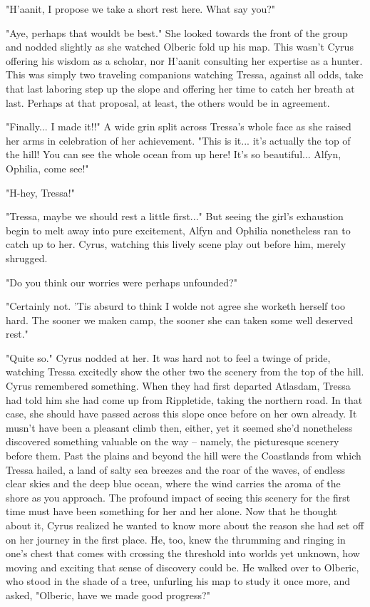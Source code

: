 "H'aanit, I propose we take a short rest here. What say you?"

"Aye, perhaps that wouldt be best." She looked towards the front of the group and nodded slightly as she watched Olberic fold up his map. This wasn't Cyrus offering his wisdom as a scholar, nor H'aanit consulting her expertise as a hunter. This was simply two traveling companions watching Tressa, against all odds, take that last laboring step up the slope and offering her time to catch her breath at last. Perhaps at that proposal, at least, the others would be in agreement.

"Finally... I made it!!" A wide grin split across Tressa's whole face as she raised her arms in celebration of her achievement. "This is it... it's actually the top of the hill! You can see the whole ocean from up here! It's so beautiful... Alfyn, Ophilia, come see!"

"H-hey, Tressa!"

"Tressa, maybe we should rest a little first..." But seeing the girl's exhaustion begin to melt away into pure excitement, Alfyn and Ophilia nonetheless ran to catch up to her. Cyrus, watching this lively scene play out before him, merely shrugged.

"Do you think our worries were perhaps unfounded?"

"Certainly not. 'Tis absurd to think I wolde not agree she worketh herself too hard. The sooner we maken camp, the sooner she can taken some well deserved rest."

"Quite so." Cyrus nodded at her. It was hard not to feel a twinge of pride, watching Tressa excitedly show the other two the scenery from the top of the hill. Cyrus remembered something. When they had first departed Atlasdam, Tressa had told him she had come up from Rippletide, taking the northern road. In that case, she should have passed across this slope once before on her own already. It musn't have been a pleasant climb then, either, yet it seemed she'd nonetheless discovered something valuable on the way -- namely, the picturesque scenery before them. Past the plains and beyond the hill were the Coastlands from which Tressa hailed, a land of salty sea breezes and the roar of the waves, of endless clear skies and the deep blue ocean, where the wind carries the aroma of the shore as you approach. The profound impact of seeing this scenery for the first time must have been something for her and her alone. Now that he thought about it, Cyrus realized he wanted to know more about the reason she had set off on her journey in the first place. He, too, knew the thrumming and ringing in one's chest that comes with crossing the threshold into worlds yet unknown, how moving and exciting that sense of discovery could be. He walked over to Olberic, who stood in the shade of a tree, unfurling his map to study it once more, and asked, "Olberic, have we made good progress?"

